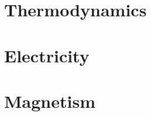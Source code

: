 \documentclass[
  12pt, %
  letterpaper,
]{LegrandOrangeBook}
\begin{document}


%
%
%
%
%
%
%
%
%
%
%
%
%
%
%
%
%
%
%
%
%
%
%

\part{Thermodynamics}




\part{Electricity}







\part{Magnetism}



\end{document}
